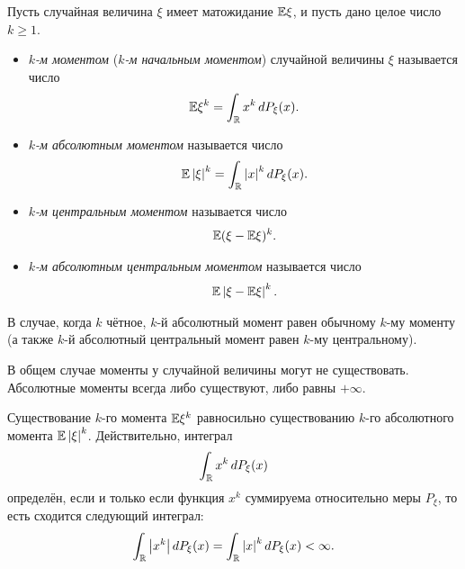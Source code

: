 \documentclass[../main.tex]{subfiles}
\begin{document}
\begin{df}
 Пусть случайная величина $ \xi $ имеет матожидание $ \mathbb E\xi $, и пусть дано целое число $ k \geqslant 1 $.
 \begin{itemize}
  \item \textit{$ k $-м моментом} (\textit{$ k $-м начальным моментом}) случайной величины $ \xi $ называется число
   \begin{align*}
    \mathbb E \xi^{k} = \int_{\mathbb{R}} x^{k}\,dP_\xi(x). 
   \end{align*}
  \item \textit{$ k $-м абсолютным моментом} называется число
   \begin{align*}
    \mathbb E \left| \xi \right|^{k} = \int_{\mathbb{R}} \left| x \right|^{k}dP_\xi(x). 
   \end{align*}
  \item \textit{$ k $-м центральным моментом} называется число
   \begin{align*}
    \mathbb E (\xi - \mathbb E \xi)^{k}.
   \end{align*}
  \item \textit{$ k $-м абсолютным центральным моментом} называется число
   \begin{align*}
    \mathbb E \left| \xi - \mathbb E\xi \right|^{k}.
   \end{align*}
 \end{itemize}
\end{df}

\begin{remrk*}
 В случае, когда $ k $ чётное, $ k $-й абсолютный момент равен обычному $ k $-му моменту (а также $ k $-й абсолютный центральный момент равен $ k $-му центральному).
\end{remrk*}

\begin{remrk*}
 В общем случае моменты у случайной величины могут не существовать. Абсолютные моменты всегда либо существуют, либо равны $ +\infty $.
\end{remrk*}

\begin{remrk}
 Существование $ k $-го момента $\mathbb E\xi^{k}$ равносильно существованию $ k $-го абсолютного момента $ \mathbb E \left|\xi \right|^{k} $. Действительно, интеграл
 \begin{align*}
  \int_{\mathbb{R}} x^{k} \,dP_\xi(x)
 \end{align*} определён, если и только если функция $ x^{k} $ суммируема относительно меры $ P_\xi $, то есть сходится следующий интеграл:
 \begin{align*}
  \int_{\mathbb{R}} \left| x^{k} \right| dP_\xi(x) =\int_{\mathbb{R}} \left| x \right|^{k} dP_\xi(x)  < \infty.
 \end{align*}
\end{remrk}
\end{document}
